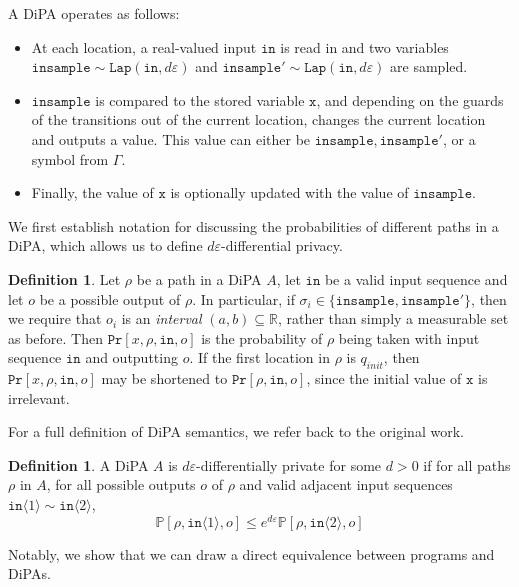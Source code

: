 \documentclass[12pt]{article}
\newcommand{\RR}{\mathbb{R}}
\newcommand{\PP}{\mathbb{P}}
\newcommand{\brangle}[1]{\langle#1 \rangle}
\newcommand{\Lap}{\texttt{Lap}}
\theoremstyle{definition}
\newtheorem{defn}[thm]{Definition}
\begin{document}
A DiPA operates as follows: 
\begin{itemize}
    \item At each location, a real-valued input $\texttt{in}$ is read in and two variables $\texttt{insample}\sim \Lap(\texttt{in}, d\varepsilon)$ and $\texttt{insample}'\sim\Lap(\texttt{in}, d\varepsilon)$ are sampled.
    \item $\texttt{insample}$ is compared to the stored variable $\texttt{x}$, and depending on the guards of the transitions out of the current location, changes the current location and outputs a value. This value can either be $\texttt{insample}, \texttt{insample}'$, or a symbol from $\Gamma$.
    \item Finally, the  value of $\texttt{x}$ is optionally updated with the value of $\texttt{insample}$.
\end{itemize}

We first establish notation for discussing the probabilities of different paths in a DiPA, which allows us to define $d\varepsilon$-differential privacy. 

\begin{defn} 
    Let $\rho$ be a path in a DiPA $A$, let $\texttt{in}$ be a valid input sequence and let $o$ be a possible output of $\rho$. In particular, if $\sigma_i\in \{\texttt{insample}, \texttt{insample}'\}$, then we require that $o_i$ is an \textit{interval} $(a, b)\subseteq \RR$, rather than simply a measurable set as before. 
    Then $\texttt{Pr}[x, \rho, \texttt{in}, o]$ is the probability of $\rho$ being taken with input sequence $\texttt{in}$ and outputting $o$. If the first location in $\rho$ is $q_{init}$, then $\texttt{Pr}[x, \rho, \texttt{in}, o]$ may be shortened to $\texttt{Pr}[\rho, \texttt{in}, o]$, since the initial value of $\texttt{x}$ is irrelevant.
\end{defn}

For a full definition of DiPA semantics, we refer back to the original work. 

\begin{defn}
    A DiPA $A$ is $d\varepsilon$-differentially private for some $d>0$ if for all paths $\rho$ in $A$, for all possible outputs $o$ of $\rho$ and valid adjacent input sequences $\texttt{in}\brangle{1}\sim \texttt{in}\brangle{2}$, \[
        \PP[\rho, \texttt{in}\brangle{1}, o]\leq e^{d\varepsilon} \PP[\rho, \texttt{in}\brangle{2}, o]
    \]
\end{defn}

Notably, we show that we can draw a direct equivalence between programs and DiPAs.
\end{document}
